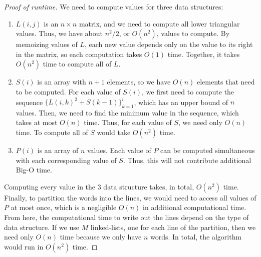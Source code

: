 \documentclass{article}
\begin{document}
\begin{proof}[Proof of runtime]
We need to compute values for three data structures:
\begin{enumerate}[1.]
\item $L(i,j)$ is an $n\times n$ matrix, and we need to compute all lower triangular values. Thus, we have about $n^2/2$, or $O(n^2)$, values to compute. By memoizing values of $L$, each new value depends only on the value to its right in the matrix, so each computation takes $O(1)$ time. Together, it takes $O(n^2)$ time to compute all of $L$.

\item $S(i)$ is an array with $n+1$ elements, so we have $O(n)$ elements that need to be computed. For each value of $S(i)$, we first need to compute the sequence $\Big \{L(i,k)^2 + S(k-1)  \Big \}_{k=1}^i$, which has an upper bound of $n$ values. Then, we need to find the minimum value in the sequence, which takes at most $O(n)$ time. Thus, for each value of $S$, we need only $O(n)$ time. To compute all of $S$ would take $O(n^2)$ time.

\item $P(i)$ is an array of $n$ values. Each value of $P$ can be computed simultaneous with each corresponding value of $S$. Thus, this will not contribute additional Big-O time.
\end{enumerate}

Computing every value in the 3 data structure takes, in total, $O(n^2)$ time. Finally, to partition the words into the lines, we would need to access all values of $P$ at most once, which is a negligible $O(n)$ in additional computational time. From here, the computational time to write out the lines depend on the type of data structure. If we use $M$ linked-lists, one for each line of the partition, then we need only $O(n)$ time because we only have $n$ words. In total, the algorithm would run in $O(n^2)$ time.
\end{proof}




\pagebreak
\end{document}
